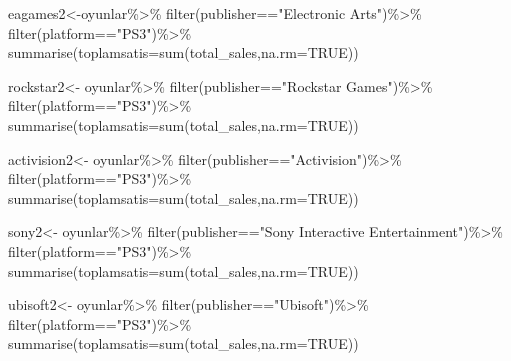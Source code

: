 \documentclass[
]{article}
\newenvironment{Shaded}{\begin{snugshade}}{\end{snugshade}}
\newcommand{\AttributeTok}[1]{\textcolor[rgb]{0.77,0.63,0.00}{#1}}
\newcommand{\ConstantTok}[1]{\textcolor[rgb]{0.00,0.00,0.00}{#1}}
\newcommand{\FunctionTok}[1]{\textcolor[rgb]{0.00,0.00,0.00}{#1}}
\newcommand{\NormalTok}[1]{#1}
\newcommand{\OtherTok}[1]{\textcolor[rgb]{0.56,0.35,0.01}{#1}}
\newcommand{\SpecialCharTok}[1]{\textcolor[rgb]{0.00,0.00,0.00}{#1}}
\newcommand{\StringTok}[1]{\textcolor[rgb]{0.31,0.60,0.02}{#1}}
\begin{document}
\begin{Shaded}
\begin{Highlighting}[]
\NormalTok{eagames2}\OtherTok{\textless{}{-}}\NormalTok{oyunlar}\SpecialCharTok{\%\textgreater{}\%}
  \FunctionTok{filter}\NormalTok{(publisher}\SpecialCharTok{==}\StringTok{"Electronic Arts"}\NormalTok{)}\SpecialCharTok{\%\textgreater{}\%}
  \FunctionTok{filter}\NormalTok{(platform}\SpecialCharTok{==}\StringTok{"PS3"}\NormalTok{)}\SpecialCharTok{\%\textgreater{}\%}
  \FunctionTok{summarise}\NormalTok{(}\AttributeTok{toplamsatis=}\FunctionTok{sum}\NormalTok{(total\_sales,}\AttributeTok{na.rm=}\ConstantTok{TRUE}\NormalTok{))}

\NormalTok{rockstar2}\OtherTok{\textless{}{-}}\NormalTok{ oyunlar}\SpecialCharTok{\%\textgreater{}\%}
  \FunctionTok{filter}\NormalTok{(publisher}\SpecialCharTok{==}\StringTok{"Rockstar Games"}\NormalTok{)}\SpecialCharTok{\%\textgreater{}\%}
  \FunctionTok{filter}\NormalTok{(platform}\SpecialCharTok{==}\StringTok{"PS3"}\NormalTok{)}\SpecialCharTok{\%\textgreater{}\%}
  \FunctionTok{summarise}\NormalTok{(}\AttributeTok{toplamsatis=}\FunctionTok{sum}\NormalTok{(total\_sales,}\AttributeTok{na.rm=}\ConstantTok{TRUE}\NormalTok{))}

\NormalTok{activision2}\OtherTok{\textless{}{-}}\NormalTok{ oyunlar}\SpecialCharTok{\%\textgreater{}\%}
  \FunctionTok{filter}\NormalTok{(publisher}\SpecialCharTok{==}\StringTok{"Activision"}\NormalTok{)}\SpecialCharTok{\%\textgreater{}\%}
  \FunctionTok{filter}\NormalTok{(platform}\SpecialCharTok{==}\StringTok{"PS3"}\NormalTok{)}\SpecialCharTok{\%\textgreater{}\%}
  \FunctionTok{summarise}\NormalTok{(}\AttributeTok{toplamsatis=}\FunctionTok{sum}\NormalTok{(total\_sales,}\AttributeTok{na.rm=}\ConstantTok{TRUE}\NormalTok{))}

\NormalTok{sony2}\OtherTok{\textless{}{-}}\NormalTok{ oyunlar}\SpecialCharTok{\%\textgreater{}\%}
  \FunctionTok{filter}\NormalTok{(publisher}\SpecialCharTok{==}\StringTok{"Sony Interactive Entertainment"}\NormalTok{)}\SpecialCharTok{\%\textgreater{}\%}
  \FunctionTok{filter}\NormalTok{(platform}\SpecialCharTok{==}\StringTok{"PS3"}\NormalTok{)}\SpecialCharTok{\%\textgreater{}\%}
  \FunctionTok{summarise}\NormalTok{(}\AttributeTok{toplamsatis=}\FunctionTok{sum}\NormalTok{(total\_sales,}\AttributeTok{na.rm=}\ConstantTok{TRUE}\NormalTok{))}

\NormalTok{ubisoft2}\OtherTok{\textless{}{-}}\NormalTok{ oyunlar}\SpecialCharTok{\%\textgreater{}\%}
  \FunctionTok{filter}\NormalTok{(publisher}\SpecialCharTok{==}\StringTok{"Ubisoft"}\NormalTok{)}\SpecialCharTok{\%\textgreater{}\%}
  \FunctionTok{filter}\NormalTok{(platform}\SpecialCharTok{==}\StringTok{"PS3"}\NormalTok{)}\SpecialCharTok{\%\textgreater{}\%}
  \FunctionTok{summarise}\NormalTok{(}\AttributeTok{toplamsatis=}\FunctionTok{sum}\NormalTok{(total\_sales,}\AttributeTok{na.rm=}\ConstantTok{TRUE}\NormalTok{))}


\end{Highlighting}
\end{Shaded}
\end{document}
